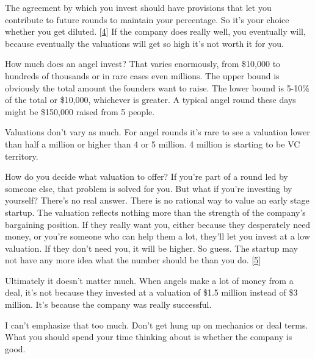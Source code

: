 The agreement by which you invest should have
                  provisions that let you contribute to future rounds to
                  maintain your percentage. So it's your choice whether you get
                  diluted.
                  [\href{\#f4n}{4}]
                  If the company does really well, you eventually will, because
                  eventually the valuations will get so high it's not worth it
                  for you.

How much does an angel invest? That varies
                  enormously, from \$10,000 to hundreds of thousands or in rare
                  cases even millions. The upper bound is obviously the total
                  amount the founders want to raise. The lower bound is 5-10\% of
                  the total or \$10,000, whichever is greater. A typical angel
                  round these days might be \$150,000 raised from 5 people.

Valuations
                  don't vary as much. For angel rounds it's rare to see a
                  valuation lower than half a million or higher than 4 or 5
                  million. 4 million is starting to be VC territory.

How
                  do you decide what valuation to offer? If you're part of a
                  round led by someone else, that problem is solved for you. But
                  what if you're investing by yourself? There's no real answer.
                  There is no rational way to value an early stage startup. The
                  valuation reflects nothing more than the strength of the
                  company's bargaining position. If they really want you, either
                  because they desperately need money, or you're someone who can
                  help them a lot, they'll let you invest at a low valuation. If
                  they don't need you, it will be higher. So guess. The startup
                  may not have any more idea what the number should be than you
                  do.
                  [\href{\#f5n}{5}]

Ultimately it doesn't matter much. When angels
                  make a lot of money from a deal, it's not because they
                  invested at a valuation of \$1.5 million instead of \$3 million.
                  It's because the company was really successful.

I
                  can't emphasize that too much. Don't get hung up on mechanics
                  or deal terms. What you should spend your time thinking about
                  is whether the company is good.

